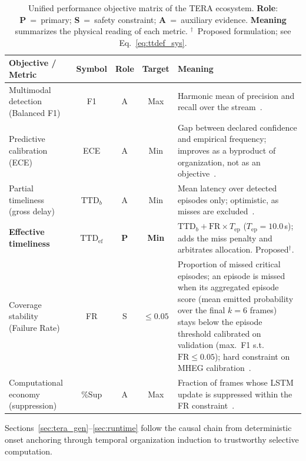 \documentclass[a4paper,fleqn]{cas-dc}
\begin{document}
\begin{table}[!tbp]
\centering
\caption{Unified performance objective matrix of the TERA ecosystem.
\textbf{Role}: \textbf{P}~=~primary; \textbf{S}~=~safety constraint;
\textbf{A}~=~auxiliary evidence. \textbf{Meaning} summarizes the physical
reading of each metric. $^\dagger$~Proposed formulation; see
Eq.~\ref{eq:ttdef_sys}.}
\label{tab:objetivos_expandida}
\footnotesize
\setlength{\tabcolsep}{4pt}
\renewcommand{\arraystretch}{1.12}
\begin{tabularx}{\textwidth}{>{\raggedright\arraybackslash}p{2.9cm}
  c c c
  >{\raggedright\arraybackslash}X}
\toprule
\textbf{Objective / Metric} & \textbf{Symbol}
  & \textbf{Role} & \textbf{Target} & \textbf{Meaning} \\
\midrule
Multimodal detection (Balanced F1)
  & F1 & A & Max
  & Harmonic mean of precision and recall over the stream~\cite{chinchor1992muc}. \\
\rowcolor{gray!8}
Predictive calibration (ECE)
  & ECE & A & Min
  & Gap between declared confidence and empirical frequency; improves as a
    byproduct of organization, not as an objective~\cite{guo2017calibration}. \\
Partial timeliness (gross delay)
  & $\mathrm{TTD}_{b}$ & A & Min
  & Mean latency over detected episodes only; optimistic, as misses are
    excluded~\cite{fawcett1999activity}. \\
\rowcolor{blue!6}
\textbf{Effective timeliness}
  & $\mathrm{TTD}_{\mathrm{ef}}$ & \textbf{P} & \textbf{Min}
  & $\mathrm{TTD}_{b} + \mathrm{FR}\times T_{\mathrm{ep}}$ ($T_{\mathrm{ep}}{=}10.0$\,s);
    adds the miss penalty and arbitrates allocation. Proposed$^\dagger$. \\
\rowcolor{gray!8}
Coverage stability (Failure Rate)
  & FR & S & $\le 0.05$
  & Proportion of missed critical episodes{\color{\revcolor}; an episode is
    missed when its aggregated episode score (mean emitted probability over
    the final $k{=}6$ frames) stays below the episode threshold calibrated on
    validation (max.\ F1 s.t.\ $\mathrm{FR}\le0.05$)}; hard constraint on MHEG
    calibration~\cite{iso26262}. \\
Computational economy (suppression)
  & \%Sup & A & Max
  & Fraction of frames whose LSTM update is suppressed within the FR
    constraint~\cite{campos2018skip}. \\
\bottomrule
\end{tabularx}
\end{table}
Sections~\ref{sec:tera_gen}--\ref{sec:runtime} follow the causal chain from deterministic onset anchoring through temporal organization induction to trustworthy selective computation.
\end{document}
